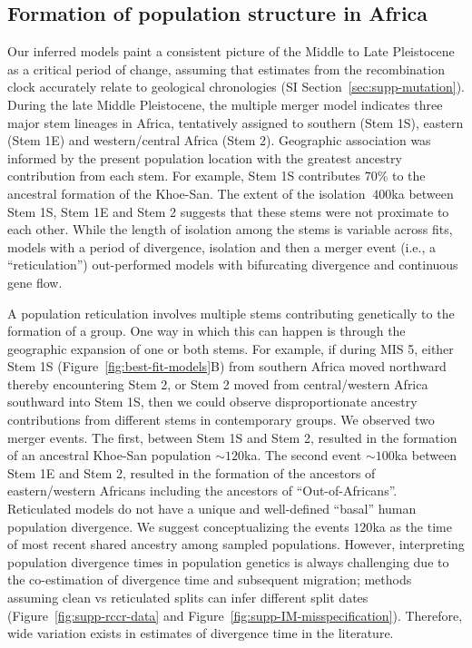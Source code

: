 \documentclass[]{article}
\begin{document}
\subsection*{Formation of population structure in Africa}

Our inferred models paint a consistent picture of the Middle to Late
Pleistocene as a critical period of change, assuming that estimates from the
recombination clock accurately relate to geological chronologies (SI
Section~\ref{sec:supp-mutation}). During the late Middle Pleistocene, the
multiple merger model indicates three major stem lineages in Africa,
tentatively assigned to southern (Stem 1S), eastern (Stem 1E) and
western/central Africa (Stem 2). Geographic association was informed by the
present population location with the greatest ancestry contribution from each
stem. For example, Stem 1S contributes 70\% to the ancestral formation of the
Khoe-San. The extent of the isolation $\>400$ka between Stem 1S, Stem 1E and Stem
2 suggests that these stems were not proximate to each other. While the length
of isolation among the stems is variable across fits, models with a period of
divergence, isolation and then a merger event (i.e., a ``reticulation'')
out-performed models with bifurcating divergence and continuous gene flow. 

A population reticulation involves multiple stems contributing genetically to
the formation of a group. One way in which this can happen is through the
geographic expansion of one or both stems. For example, if during MIS 5, either
Stem 1S (Figure~\ref{fig:best-fit-models}B) from southern Africa moved
northward thereby encountering Stem 2, or Stem 2 moved from central/western
Africa southward into Stem 1S, then we could observe disproportionate
ancestry contributions from different stems in contemporary groups. We observed
two merger events. The first, between Stem 1S and Stem 2, resulted in the
formation of an ancestral Khoe-San population $\sim120$ka. The second event
$\sim100$ka between Stem 1E and Stem 2, resulted in the formation of the
ancestors of eastern/western Africans including the ancestors of
``Out-of-Africans''. Reticulated models do not have a unique and 
well-defined ``basal'' human population divergence.
We suggest conceptualizing the events $120$ka as the time of most recent
shared ancestry among sampled populations.
However, interpreting population divergence times in population genetics is 
always challenging due
to the co-estimation of divergence time and subsequent migration;
methods assuming clean vs reticulated splits can infer different split dates
(Figure~\ref{fig:supp-rccr-data} and Figure~\ref{fig:supp-IM-misspecification}).
Therefore, wide variation exists in estimates of divergence time in the
literature\citep{Bergstrom2021-iw,Henn2018-rf}.
\end{document}
